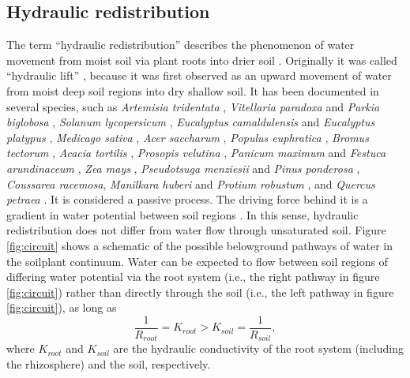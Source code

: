 \subsection{Hydraulic redistribution}

The term ``hydraulic redistribution'' describes the phenomenon of water movement from moist soil via plant roots into drier soil \parencite{burgess_redistribution_1998}.  Originally it was called ``hydraulic lift'' \parencite{richards_hydraulic_1987}, because it was first observed as an upward movement of water from moist deep soil regions into dry shallow soil.  It has been documented in several species, such as
\emph{Artemisia tridentata} \parencite{richards_hydraulic_1987,caldwell_hydraulic_1989},
\emph{Vitellaria paradoxa} and \emph{Parkia biglobosa} \parencite{bayala_hydraulic_2008},
\emph{Solanum lycopersicum} \parencite{bormann_moisture_1957},
\emph{Eucalyptus camaldulensis} and \emph{Eucalyptus platypus} \parencite{burgess_tree_2001},
\emph{Medicago sativa} \parencite{corak_water_1987},
\emph{Acer saccharum} \parencite{dawson_hydraulic_1993},
\emph{Populus euphratica} \parencite{hao_hydraulic_2010},
\emph{Bromus tectorum} \parencite{leffler_hydraulic_2005},
\emph{Acacia tortilis} \parencite{ludwig_hydraulic_2003},
\emph{Prosopis velutina} \parencite{scott_ecohydrologic_2008},
\emph{Panicum maximum} and \emph{Festuca arundinaceum} \parencite{sekiya_applying_2011},
\emph{Zea mays} \parencite{wan_hydraulic_2000},
\emph{Pseudotsuga menziesii} and \emph{Pinus ponderosa} \parencite{warren_hydraulic_2007},
\emph{Coussarea racemosa}, \emph{Manilkara huberi} and \emph{Protium robustum} \parencite{Oliveira_2005}, and
\emph{Quercus petraea} \parencite{zapater_evidence_2011}.
It is considered a passive process.  The driving force behind it is a gradient in water potential between soil regions \parencite{scott_ecohydrologic_2008}.  In this sense, hydraulic redistribution does not differ from water flow through unsaturated soil.  Figure \ref{fig:circuit} shows a schematic of the possible belowground pathways of water in the soil\textendash{}plant continuum.  Water can be expected to flow between soil regions of differing water potential via the root system (i.e., the right pathway in figure \ref{fig:circuit}) rather than directly through the soil (i.e., the left pathway in figure \ref{fig:circuit}), as long as
\begin{equation*}
\frac{1}{R_{root}} = K_{root}  >  K_{soil} = \frac{1}{R_{soil}},
\end{equation*}
where $K_{root}$ and $K_{soil}$ are the hydraulic conductivity of the root system (including the rhizosphere) and the soil, respectively.
